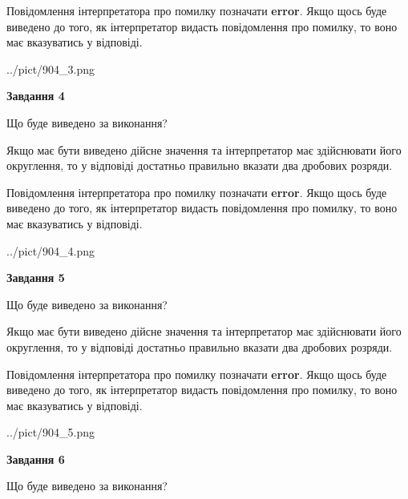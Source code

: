 \documentclass[12pt, ukrainian]{article}
\begin{document}
{\begin {Large}
Повідомлення інтерпретатора про помилку позначати \textbf{error}.
Якщо щось буде виведено до того, як інтерпретатор видасть повідомлення про помилку, 
то воно має вказуватись у відповіді. \par

\begin{center}
	{../pict/904_3.png}
\end{center}
\newpage

{\begin {center}\textbf{Завдання 4}\end {center}}\par
Що буде виведено за виконання? \par

Якщо має бути виведено дійсне значення та інтерпретатор має здійснювати його округлення, 
то у відповіді достатньо правильно вказати два дробових розряди.

Повідомлення інтерпретатора про помилку позначати \textbf{error}.
Якщо щось буде виведено до того, як інтерпретатор видасть повідомлення про помилку, 
то воно має вказуватись у відповіді. \par

\begin{center}
	{../pict/904_4.png}
\end{center}
\newpage

{\begin {center}\textbf{Завдання 5}\end {center}}\par
Що буде виведено за виконання? \par

Якщо має бути виведено дійсне значення та інтерпретатор має здійснювати його округлення, 
то у відповіді достатньо правильно вказати два дробових розряди.

Повідомлення інтерпретатора про помилку позначати \textbf{error}.
Якщо щось буде виведено до того, як інтерпретатор видасть повідомлення про помилку, 
то воно має вказуватись у відповіді. \par

\begin{center}
	{../pict/904_5.png}
\end{center}
\newpage

{\begin {center}\textbf{Завдання 6}\end {center}}\par
Що буде виведено за виконання? \par


\end{Large}}
\end{document}
